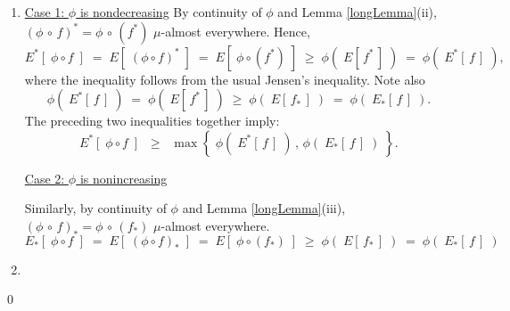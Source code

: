 \begin{enumerate}
\item
	\underline{Case 1: $\phi$ is nondecreasing}
	\vskip 0.0cm
	\noindent
	By continuity of $\phi$ and Lemma \ref{longLemma}(ii),
	$(\phi\,\circ\,f)^{*} = \phi\,\circ\,(f^{*})$ $\mu$-almost everywhere.
	Hence,
	\begin{equation*}
	E^{*}\!\left[\;\phi \circ f\;\right]
		\;=\; E\!\left[\;(\phi \circ f)^{*}\;\right]
		\;=\; E\!\left[\;\phi \circ (f^{*})\;\right]
		\;\geq\; \phi(\;E[\,f^{*}\,]\;)
		\;=\; \phi(\;E^{*}[\,f\,]\;),
	\end{equation*}
	where the inequality follows from the usual Jensen's inequality.
	Note also
	\begin{equation*}
	\phi(\;E^{*}[\,f\,]\;)
		\;=\; \phi(\;E[\,f^{*}\,]\;)
		\;\geq\; \phi(\;E[\,f_{*}\,]\;)
		\;=\; \phi(\;E_{*}[\,f\,]\;).
	\end{equation*}
	The preceding two inequalities together imply:
	\begin{equation*}
	E^{*}\!\left[\;\phi \circ f\;\right]
		\;\;\geq\;\; \max\!\left\{\;\phi(\;E^{*}[\,f\,]\;) \,,\, \phi(\;E_{*}[\,f\,]\;)\;\right\}.
	\end{equation*}

	\vskip 0.1cm
	\underline{Case 2: $\phi$ is nonincreasing}
	\vskip 0.0cm
	\noindent

	\vskip 0.1cm
	\noindent
	Similarly, by continuity of $\phi$ and Lemma \ref{longLemma}(iii),
	$(\phi\,\circ\,f)_{*} = \phi\,\circ\,(f_{*})$ $\mu$-almost everywhere.
	\begin{equation*}
	E_{*}\!\left[\;\phi \circ f\;\right]
		\;=\; E\!\left[\;(\phi \circ f)_{*}\;\right]
		\;=\; E\!\left[\;\phi \circ (f_{*})\;\right]
		\;\geq\; \phi(\;E[\,f_{*}\,]\;)
		\;=\; \phi(\;E_{*}[\,f\,]\;)
	\end{equation*}
\item
\end{enumerate}

\qed



\renewcommand{\theenumi}{\roman{enumi}}
\renewcommand{\labelenumi}{\textnormal{(\theenumi)}$\;\;$}

